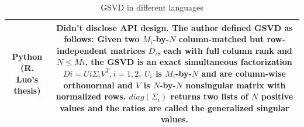 \begin{table}[H]
\begin{tabular}{|c|c|}
            \\\hline
            Python (R. Luo's thesis) &  \makecell[l]{Didn't disclose API design. The author defined GSVD as follows: \\
            Given two $M_i$-by-$N$ column-matched but row-independent matrices $D_{i}$, \\ each with full column rank and $N \leq Mi$, the GSVD is an exact \\ simultaneous factorization $Di = Ui \Sigma_i V^T, i = 1, 2$. $U_i$ is $M_i$-by-$N$ and \\ are column-wise orthonormal and $V$ is $N$-by-$N$ nonsingular matrix with\\ normalized rows. $diag(\Sigma_i)$ returns two lists of $N$ positive values and \\the ratios are called the generalized singular values.} \\ \hline
        \end{tabular}
        \caption{GSVD in different languages}
        \label{tab:gsvdlang}
    \end{table}